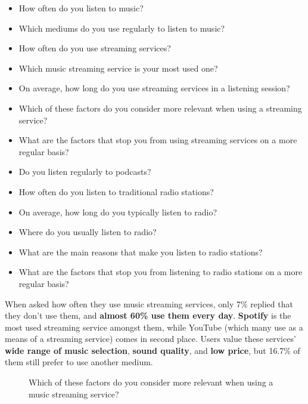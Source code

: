 \begin{itemize}
  \item How often do you listen to music?
  \item Which mediums do you use regularly to listen to music?
  \item How often do you use streaming services?
  \item Which music streaming service is your most used one?
  \item On average, how long do you use streaming services in a listening session?
  \item Which of these factors do you consider more relevant when using a streaming service?
  \item What are the factors that stop you from using streaming services on a more regular basis?
  \item Do you listen regularly to podcasts?
  \item How often do you listen to traditional radio stations?
  \item On average, how long do you typically listen to radio?
  \item Where do you usually listen to radio?
  \item What are the main reasons that make you listen to radio stations?
  \item What are the factors that stop you from listening to radio stations on a more regular basis?
\end{itemize}

When asked how often they use music streaming services, only 7\% replied that they don't use them, and \textbf{almost 60\% use them every day}. \textbf{Spotify} is the most used streaming service amongst them, while YouTube (which many use as a means of a streaming service) comes in second place. Users value these services' \textbf{wide range of music selection}, \textbf{sound quality}, and \textbf{low price}, but 16.7\% of them still prefer to use another medium.

\begin{figure}
	\centering
	\caption{Which of these factors do you consider more relevant when using a music streaming service?}
	\begin{bchart}[step=10,max=80,unit=\%,width=0.8\textwidth]
            \smallskip
            \smallskip
            \smallskip
            \smallskip
    \end{bchart}
\end{figure}


